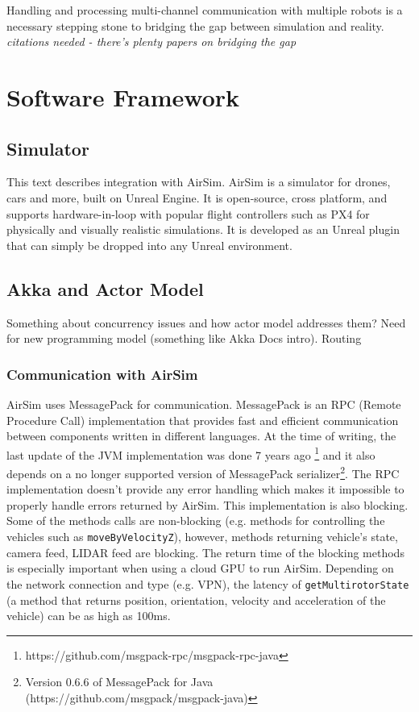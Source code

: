 \documentclass{article}
\begin{document}
Handling and processing multi-channel communication with multiple robots is a necessary stepping stone to bridging the gap between simulation and reality. \emph{citations needed - there's plenty papers on bridging the gap}




\section{Software Framework}

\subsection{Simulator}
This text describes integration with AirSim. AirSim is a simulator for drones, cars and more, built on Unreal Engine. It is open-source, cross platform, and supports hardware-in-loop with popular flight controllers such as PX4 for physically and visually realistic simulations. It is developed as an Unreal plugin that can simply be dropped into any Unreal environment. \cite{shah2018airsim}

\subsection{Akka and Actor Model}
Something about concurrency issues and how actor model addresses them?
Need for new programming model (something like Akka Docs intro).
Routing


\subsubsection{Communication with AirSim}
AirSim uses MessagePack \cite{messagepack} for communication. MessagePack is an RPC (Remote Procedure Call) implementation that provides fast and efficient communication between components written in different languages. At the time of writing, the last update of the JVM implementation was done 7 years ago \footnote{https://github.com/msgpack-rpc/msgpack-rpc-java} and it also depends on a no longer supported version of MessagePack serializer\footnote{Version 0.6.6 of MessagePack for Java (https://github.com/msgpack/msgpack-java)}. The RPC implementation doesn't provide any error handling which makes it impossible to properly handle errors returned by AirSim. This implementation is also blocking. Some of the methods calls are non-blocking (e.g. methods for controlling the vehicles such as \verb|moveByVelocityZ|), however, methods returning vehicle's state, camera feed, LIDAR feed are blocking. The return time of the blocking methods is especially important when using a cloud GPU to run AirSim. Depending on the network connection and type (e.g. VPN), the latency of \verb|getMultirotorState| (a method that returns position, orientation, velocity and acceleration of the vehicle) can be as high as 100ms.
\end{document}
